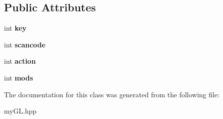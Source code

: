 \subsection*{Public Attributes}
\begin{DoxyCompactItemize}
\item 
\hypertarget{classKey_a49ddb6c986197664f6939db5dfd9c244}{}int {\bfseries key}\label{classKey_a49ddb6c986197664f6939db5dfd9c244}

\item 
\hypertarget{classKey_a13cb660e3e0d92129eeeaa56c5cc8296}{}int {\bfseries scancode}\label{classKey_a13cb660e3e0d92129eeeaa56c5cc8296}

\item 
\hypertarget{classKey_add8acc14210865bd9959bf38ee4e82f8}{}int {\bfseries action}\label{classKey_add8acc14210865bd9959bf38ee4e82f8}

\item 
\hypertarget{classKey_a0e3f757c5b28ee99c9bf6f07811e6637}{}int {\bfseries mods}\label{classKey_a0e3f757c5b28ee99c9bf6f07811e6637}

\end{DoxyCompactItemize}


The documentation for this class was generated from the following file\+:\begin{DoxyCompactItemize}
\item 
my\+G\+L.\+hpp\end{DoxyCompactItemize}
